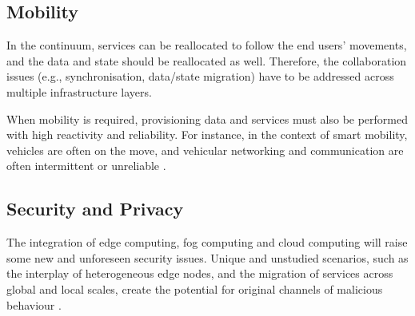 \subsection{Mobility}

In the continuum, services can be reallocated to follow the end users' movements, and the data and state should be reallocated as well. Therefore, the collaboration issues (e.g., synchronisation, data/state migration) have to be addressed across multiple infrastructure layers.

When mobility is required, provisioning data and services must also be performed with high reactivity and reliability. For instance, in the context of smart mobility, vehicles are often on the move, and vehicular networking and communication are often intermittent or unreliable \cite{he2014developing}.





\subsection{Security and Privacy}

The integration of edge computing, fog computing and cloud computing will raise some new and unforeseen security issues. Unique and unstudied scenarios, such as the interplay of heterogeneous edge nodes, and the migration of services across global and local scales, create the potential for original channels of malicious behaviour \cite{yu2017survey}.

